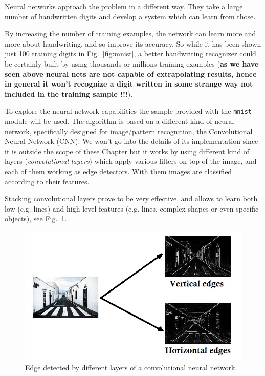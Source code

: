 Neural networks approach the problem in a different way. They take a large number of handwritten digits and develop a system which can learn from those.

By increasing the number of training examples, the network can learn more and more about handwriting, and so improve its accuracy. So while it has been shown just 100 training digits in Fig.~\ref{fig:mnist}, a better handwriting recognizer could be certainly built by using thousands or millions training examples (\textbf{as we have seen above neural nets are not capable of extrapolating results, hence in general it won't recognize a digit written in some strange way not included in the training sample !!!}).

To explore the neural network capabilities the sample provided with the \texttt{mnist} module will be used. 
The algorithm is based on a different kind of neural network, specifically designed for image/pattern recognition, the Convolutional Neural Network (CNN). We won't go into the details of its implementation since it is outside the scope of these Chapter but it works by using different kind of layers (\emph{convolutional layers}) which apply various filters on top of the image, and each of them working as edge detectors. With them images are classified according to their features.

Stacking convolutional layers prove to be very effective, and allows to learn both low (e.g. lines) and high level features (e.g. lines, complex shapes or even specific objects), see Fig.~\ref{fig:conv_filters}.

\begin{figure}[htb]
\centering
\includegraphics[width=1.\textwidth]{figures/edges.jpg}
\caption{Edge detected by different layers of a convolutional neural network.}
\label{fig:conv_filters}
\end{figure}

